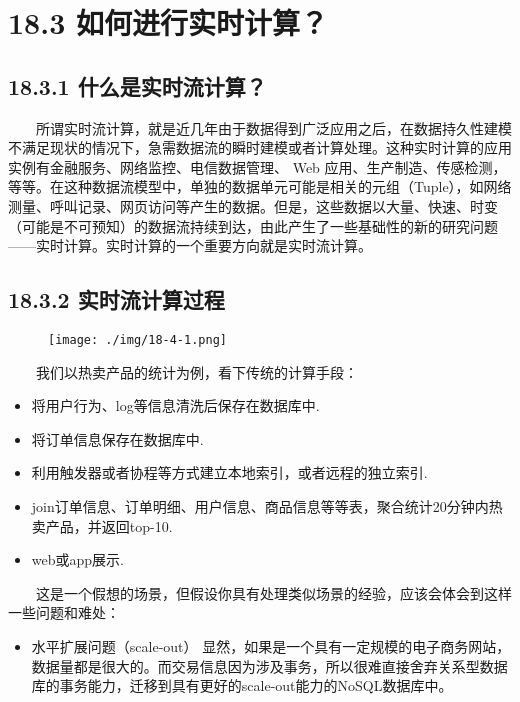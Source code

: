 \section{18.3
如何进行实时计算？}\label{ux5982ux4f55ux8fdbux884cux5b9eux65f6ux8ba1ux7b97}

\subsection{18.3.1
什么是实时流计算？}\label{ux4ec0ux4e48ux662fux5b9eux65f6ux6d41ux8ba1ux7b97}

  所谓实时流计算，就是近几年由于数据得到广泛应用之后，在数据持久性建模不满足现状的情况下，急需数据流的瞬时建模或者计算处理。这种实时计算的应用实例有金融服务、网络监控、电信数据管理、
Web
应用、生产制造、传感检测，等等。在这种数据流模型中，单独的数据单元可能是相关的元组（Tuple），如网络测量、呼叫记录、网页访问等产生的数据。但是，这些数据以大量、快速、时变（可能是不可预知）的数据流持续到达，由此产生了一些基础性的新的研究问题------实时计算。实时计算的一个重要方向就是实时流计算。

\subsection{18.3.2
实时流计算过程}\label{ux5b9eux65f6ux6d41ux8ba1ux7b97ux8fc7ux7a0b}

\begin{figure}
\centering
\texttt{[image: ./img/18-4-1.png]}
\caption{}
\end{figure}

  我们以热卖产品的统计为例，看下传统的计算手段：

\begin{itemize}
\item
  将用户行为、log等信息清洗后保存在数据库中.
\item
  将订单信息保存在数据库中.
\item
  利用触发器或者协程等方式建立本地索引，或者远程的独立索引.
\item
  join订单信息、订单明细、用户信息、商品信息等等表，聚合统计20分钟内热卖产品，并返回top-10.
\item
  web或app展示.
\end{itemize}

  这是一个假想的场景，但假设你具有处理类似场景的经验，应该会体会到这样一些问题和难处：

\begin{itemize}
\item
  水平扩展问题（scale-out）
  显然，如果是一个具有一定规模的电子商务网站，数据量都是很大的。而交易信息因为涉及事务，所以很难直接舍弃关系型数据库的事务能力，迁移到具有更好的scale-out能力的NoSQL数据库中。
\end{itemize}

